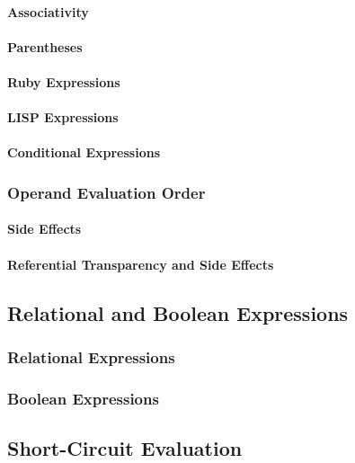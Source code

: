 \paragraph{Associativity}\label{par:Operator_Evaluation_Order-Associativity}
\paragraph{Parentheses}\label{par:Operator_Evaluation_Order-Parentheses}
\paragraph{Ruby Expressions}\label{par:Operator_Evaluation_Order-Ruby_Expressions}
\paragraph{LISP Expressions}\label{par:Operator_Evaluation_Order-LISP_Expressions}
\paragraph{Conditional Expressions}\label{par:Operator_Evaluation_Order-Conditional_Expressions}

\subsubsection{Operand Evaluation Order}\label{subsubsec:Operand_Evaluation_Order}
\paragraph{Side Effects}\label{par:Operand_Evaluation-Side_Effects}
\paragraph{Referential Transparency and Side Effects}\label{par:Operand_Evaluation-Referential_Transparency_Side_Effects}

\subsection{Relational and Boolean Expressions}\label{subsec:Relational_Boolean_Expressions}
\subsubsection{Relational Expressions}\label{subsubsec:Relational_Expressions}
\subsubsection{Boolean Expressions}\label{subsubsec:Boolean_Expressions}

\subsection{Short-Circuit Evaluation}\label{subsec:Short_Circuit_Evaluation}

